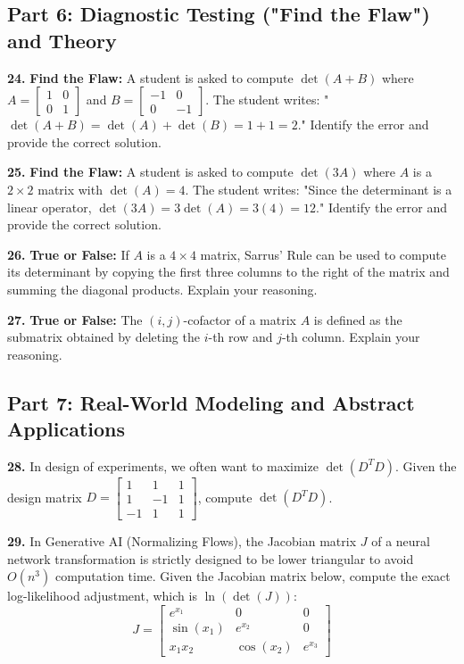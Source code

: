 \documentclass[11pt]{article}
\begin{document}
\subsection*{Part 6: Diagnostic Testing ("Find the Flaw") and Theory}

\textbf{24.} \textbf{Find the Flaw:} A student is asked to compute $\det(A+B)$ where $A = \begin{bmatrix} 1 & 0 \\ 0 & 1 \end{bmatrix}$ and $B = \begin{bmatrix} -1 & 0 \\ 0 & -1 \end{bmatrix}$. The student writes: "$\det(A+B) = \det(A) + \det(B) = 1 + 1 = 2$." Identify the error and provide the correct solution.

\textbf{25.} \textbf{Find the Flaw:} A student is asked to compute $\det(3A)$ where $A$ is a $2 \times 2$ matrix with $\det(A) = 4$. The student writes: "Since the determinant is a linear operator, $\det(3A) = 3\det(A) = 3(4) = 12$." Identify the error and provide the correct solution.

\textbf{26.} \textbf{True or False:} If $A$ is a $4 \times 4$ matrix, Sarrus' Rule can be used to compute its determinant by copying the first three columns to the right of the matrix and summing the diagonal products. Explain your reasoning.

\textbf{27.} \textbf{True or False:} The $(i,j)$-cofactor of a matrix $A$ is defined as the submatrix obtained by deleting the $i$-th row and $j$-th column. Explain your reasoning.

\subsection*{Part 7: Real-World Modeling and Abstract Applications}

\textbf{28.} In design of experiments, we often want to maximize $\det(D^T D)$. Given the design matrix $D = \begin{bmatrix} 1 & 1 & 1 \\ 1 & -1 & 1 \\ -1 & 1 & 1 \end{bmatrix}$, compute $\det(D^T D)$.

\textbf{29.} In Generative AI (Normalizing Flows), the Jacobian matrix $J$ of a neural network transformation is strictly designed to be lower triangular to avoid $O(n^3)$ computation time. Given the Jacobian matrix below, compute the exact log-likelihood adjustment, which is $\ln(\det(J))$:
$$J = \begin{bmatrix} e^{x_1} & 0 & 0 \\ \sin(x_1) & e^{x_2} & 0 \\ x_1 x_2 & \cos(x_2) & e^{x_3} \end{bmatrix}$$
\end{document}
